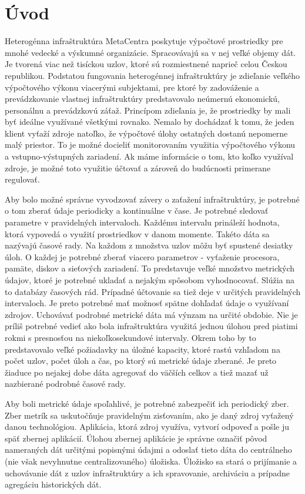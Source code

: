 \documentclass[printed,11pt,twoside,color,cover,table]{fithesis3}
\begin{document}
\chapter{Úvod}
Heterogénna infraštruktúra MetaCentra poskytuje výpočtové prostriedky pre mnohé vedecké a výskumné organizácie. Spracovávajú sa v nej veľké objemy dát. Je tvorená viac než tisíckou uzlov, ktoré sú
rozmiestnené naprieč celou
Českou republikou. Podstatou fungovania heterogénnej infraštruktúry je zdieľanie veľkého výpočtového výkonu viacerými subjektami, pre ktoré by zadováženie a prevádzkovanie vlastnej infraštruktúry predstavovalo neúmernú 
ekonomickú, personálnu a prevádzkovú záťaž. Princípom zdieľania je, že prostriedky by mali byť ideálne využívané všetkými rovnako. Nemalo by dochádzať k tomu, že jeden klient vyťaží zdroje natoľko, že 
výpočtové úlohy ostatných dostanú nepomerne malý priestor. To je možné docieliť monitorovaním využitia výpočtového výkonu a vstupno-výstupných zariadení. Ak máme informácie o tom, kto koľko využíval zdroje, 
je možné toto využitie účtovať a zároveň do budúcnosti primerane regulovať. 

Aby bolo možné správne vyvodzovať závery o zaťažení infraštruktúry, je potrebné o tom zberať údaje periodicky a kontinuálne v čase. Je potrebné sledovať parametre v pravidelných intervaloch. Každému intervalu 
prináleží hodnota, ktorá vypovedá o využití prostriedkov v danom momente. Takéto dáta sa nazývajú časové rady. Na každom z množstva uzlov môžu byť spustené desiatky úloh. O každej je
potrebné zberať viacero parametrov - vyťaženie procesora, pamäte, diskov a sieťových zariadení. To predstavuje veľké množstvo metrických údajov, ktoré je potrebné ukladať a nejakým spôsobom vyhodnocovať. 
Slúžia na to 
databázy časových rád. Prípadné účtovanie sa tiež deje v určitých pravidelných intervaloch. Je preto potrebné mať možnosť spätne dohľadať údaje o využívaní zdrojov. Uchovávať podrobné metrické dáta má výnzam na určité
obdobie. Nie je príliš potrebné vedieť ako bola infraštruktúra využitá jednou úlohou pred piatimi rokmi s presnosťou na niekoľkosekundové intervaly. Okrem toho by to predstavovalo veľké požiadavky na úložné kapacity, 
ktoré rastú vzhľadom na počet uzlov, počet úloh a čas, po ktorý sú metrické údaje zberané. Je preto žiaduce po nejakej dobe dáta agregovať do väčších celkov a tiež mazať už nazbierané podrobné časové rady.

Aby boli metrické údaje spoľahlivé, je potrebné zabezpečiť ich periodický zber. Zber metrík sa uskutočňuje pravidelným zisťovaním, ako je daný zdroj vyťažený danou technológiou. 
Aplikácia, ktorá zdroj využíva, vytvorí odpoveď a pošle ju späť zbernej aplikácií. Úlohou zbernej aplikácie je správne označiť pôvod nameraných dát určitými popisnými údajmi a odoslať tieto dáta
do centrálneho (nie však nevyhnutne centralizovaného) úložiska. Úložisko sa stará o prijímanie a uchovávanie dát z uzlov infraštruktúry a ich spravovanie, archiváciu a prípadne agregáciu historických dát.
\end{document}
